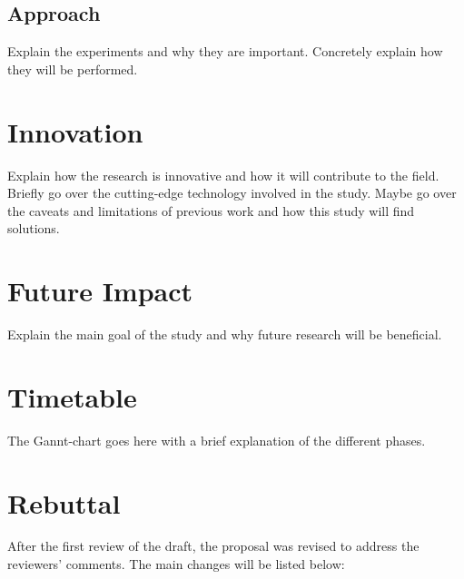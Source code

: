 \documentclass[10pt]{article}
\begin{document}
\subsection*{Approach}\label{subsec:approach}
Explain the experiments and why they are important. Concretely explain how they
will be performed.


\section*{Innovation}\label{sec:innovation}
Explain how the research is innovative and how it will contribute to the field.
Briefly go over the cutting-edge technology involved in the study. Maybe go
over the caveats and limitations of previous work and how this study will find
solutions.

\section*{Future Impact}\label{sec:impact}
Explain the main goal of the study and why future research will be beneficial.

\section*{Timetable}\label{sec:timetable}
The Gannt-chart goes here with a brief explanation of the different phases.

\printbibliography%

\section*{Rebuttal}\label{sec:rebuttal}
After the first review of the draft, the proposal was revised to address the
reviewers' comments. The main changes will be listed below:
\end{document}
